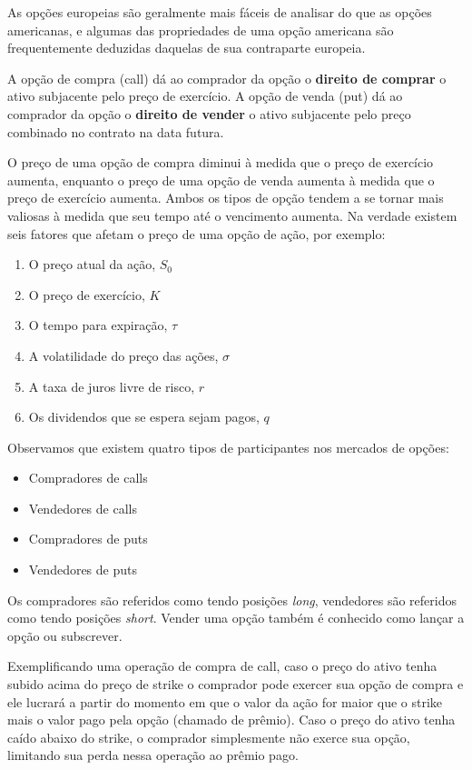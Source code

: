 \documentclass[]{book}
\providecommand{\tightlist}{%
  \setlength{\itemsep}{0pt}\setlength{\parskip}{0pt}}
\theoremstyle{definition}
\theoremstyle{definition}
\theoremstyle{definition}
\theoremstyle{remark}
\begin{document}
As opções europeias são geralmente mais fáceis de analisar do que as opções americanas, e algumas das propriedades de uma opção americana são frequentemente deduzidas daquelas de sua contraparte europeia.

A opção de compra (call) dá ao comprador da opção o \textbf{direito de comprar} o ativo subjacente pelo preço de exercício. A opção de venda (put) dá ao comprador da opção o \textbf{direito de vender} o ativo subjacente pelo preço combinado no contrato na data futura.

O preço de uma opção de compra diminui à medida que o preço de exercício
aumenta, enquanto o preço de uma opção de venda aumenta à medida que o preço de
exercício aumenta. Ambos os tipos de opção tendem a se tornar mais valiosas à medida que seu tempo até o vencimento aumenta. Na verdade existem seis fatores que afetam o preço de uma opção de ação, por exemplo:

\begin{enumerate}
\def\labelenumi{\arabic{enumi}.}
\tightlist
\item
  O preço atual da ação, \(S_0\)
\item
  O preço de exercício, \(K\)
\item
  O tempo para expiração, \(\tau\)
\item
  A volatilidade do preço das ações, \(\sigma\)
\item
  A taxa de juros livre de risco, \(r\)
\item
  Os dividendos que se espera sejam pagos, \(q\)
\end{enumerate}

Observamos que existem quatro tipos de participantes nos mercados de opções:

\begin{itemize}
\tightlist
\item
  Compradores de calls
\item
  Vendedores de calls
\item
  Compradores de puts
\item
  Vendedores de puts
\end{itemize}

Os compradores são referidos como tendo posições \emph{long}, vendedores são referidos
como tendo posições \emph{short}. Vender uma opção também é conhecido como lançar a opção ou subscrever.

Exemplificando uma operação de compra de call, caso o preço do ativo tenha subido acima do preço de strike o comprador pode exercer sua opção de compra e ele lucrará a partir do momento em que o valor da ação for maior que o strike mais o valor pago pela opção (chamado de prêmio). Caso o preço do ativo tenha caído abaixo do strike, o comprador simplesmente não exerce sua opção, limitando sua perda nessa operação ao prêmio pago.
\end{document}
